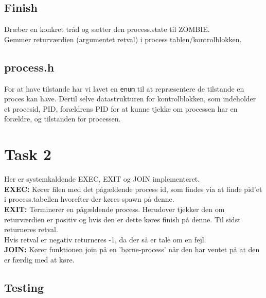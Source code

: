 \documentclass[a4paper,12pt]{article}
\begin{document}
\subsection*{Finish}
Dræber en konkret tråd og sætter den process.state til ZOMBIE. 
\\
Gemmer returværdien (argumentet retval) i process tablen/kontrolblokken. 

\subsection*{process.h}
For at have tilstande har vi lavet en \texttt{enum} til at repræsentere de tilstande en proces kan have. Dertil selve datastrukturen for kontrolblokken, som indeholder et procesid, PID, forældrens PID for at kunne tjekke om processen har en forældre, og tilstanden for processen.


\section*{Task 2}
Her er systemkaldende EXEC, EXIT og JOIN implementeret. 
\\[5px]
\textbf{EXEC:} Kører filen med det pågældende process id, som findes via at finde pid'et i process.tabellen hvorefter der køres spawn på denne. 
\\
\textbf{EXIT:} Terminerer en pågældende process. Herudover tjekker den om returværdien er positiv og hvis den er dette køres finish på denne. Til sidst returneres retval.
\\
Hvis retval er negativ returneres -1, da der så er tale om en fejl.
\\
\textbf{JOIN:}
Kører funktionen join på en 'børne-process' når den har ventet på at den er færdig med at køre.




\subsection*{Testing}
\end{document}
